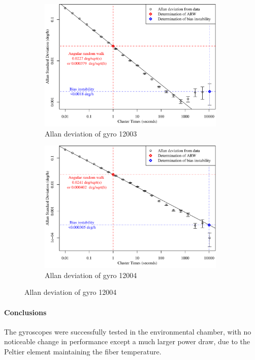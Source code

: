 \begin{figure}[!ht]
	\begin{subfigure}[b]{0.5\textwidth}
		\centering
		\includegraphics[width=0.98\textwidth]{Figures/allandev_12003.pdf} 
		\caption{Allan deviation of gyro 12003}
		\label{subfig:allan12003}
	\end{subfigure}
	\begin{subfigure}[b]{0.5\textwidth}
		\centering
		\includegraphics[width=0.98\textwidth]{Figures/allandev_12004.pdf} 
		\caption{Allan deviation of gyro 12004}
		\label{subfig:allan12004}
	\end{subfigure}

\end{figure}


\paragraph{Conclusions{}}
The gyroscopes were successfully tested in the environmental chamber, with no noticeable change in performance except a much larger power draw, due to the Peltier element maintaining the fiber temperature.


